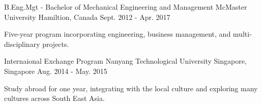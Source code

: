 

\begin{cventries}

  \cventry
    {B.Eng.Mgt - Bachelor of Mechanical Engineering and Management} %
    {McMaster University} %
    {Hamiltion, Canada} %
    {Sept. 2012 -  Apr. 2017} %
    {
      \begin{cvitems} %
        \item {Five-year program incorporating engineering, business management, and multi-disciplinary projects.}
      \end{cvitems}
    }

  \cventry
    {Internaional Exchange Program} %
    {Nanyang Technological University} %
    {Singapore, Singapore} %
    {Aug. 2014 - May. 2015} %
    {
      \begin{cvitems} %
        \item {Study abroad for one year, integrating with the local culture and exploring many cultures across South East Asia.}
      \end{cvitems}
    }

\end{cventries}
